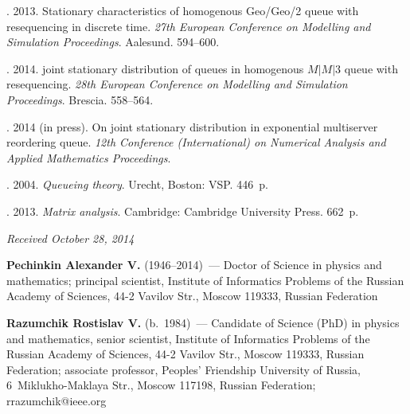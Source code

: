 \begin{multicols}{2}
{{\begin{thebibliography}{99}
. 2013.
Stationary characteristics of homogenous Geo/Geo/2
queue with resequencing in discrete time.
\textit{27th European Conference
on Modelling and Simulation Proceedings}. Aalesund. 594--600.

. 2014.
joint stationary distribution of queues
in homogenous $M \vert M \vert3$ queue with resequencing.
\textit{28th European Conference
on Modelling and Simulation Proceedings}. Brescia. 558--564.

. 2014 (in press).
On joint stationary distribution in exponential
multiserver reordering queue.
\textit{12th  Conference (International) on
Numerical Analysis and Applied Mathematics Proceedings}.

. 2004.
\textit{Queueing theory}. Urecht, Boston: VSP. 446~p.

. 2013.
\textit{Matrix analysis}. Cambridge: Cambridge University Press. 662~p.
\end{thebibliography}

 }
 }

\end{multicols}

\vspace*{-6pt}

\hfill{\small\textit{Received October 28, 2014}}

\vspace*{-18pt}

\Contr

\noindent
\textbf{Pechinkin Alexander V.} (1946--2014)~--- Doctor
of Science in physics and mathematics; principal
scientist, Institute of Informatics Problems of
the Russian Academy of Sciences, 44-2 Vavilov Str.,
Moscow 119333, Russian Federation


\vspace*{3pt}

\noindent
\textbf{Razumchik Rostislav V.} (b.\ 1984)~--- Candidate
of Science (PhD) in physics and mathematics,
senior scientist, Institute of Informatics
Problems of the Russian Academy of Sciences, 44-2 Vavilov Str.,
Moscow 119333, Russian Federation;
associate professor,
Peoples' Friendship University of Russia,
6~Miklukho-Maklaya Str., Moscow 117198, Russian Federation;
rrazumchik@ieee.org


\label{end\stat}

\renewcommand{\bibname}{\protect\rm Литература}